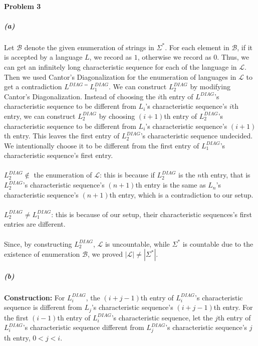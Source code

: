 \documentclass[12pt]{article}
\theoremstyle{definition}
\numberwithin{equation}{section}
\begin{document}
\paragraph{Problem 3}
\subparagraph{(a)} 
Let $\mathcal{B}$ denote the given enumeration of strings in $\Sigma^*$. For each element in $\mathcal{B}$, if it is accepted by a language $L$, we record as $1$, otherwise we record as $0$. Thus, we can get an infinitely long characteristic sequence for each of the language in $\mathcal{L}$. Then we used Cantor’s Diagonalization for the enumeration of languages in $\mathcal{L}$ to get a contradiction $L^{DIAG=}L^{DIAG}_1$. We can construct $L^{DIAG}_2$ by modifying Cantor’s Diagonalization. Instead of choosing the $i$th entry of $L^{DIAG}$'s characteristic sequence to be different from $L_i$'s characteristic sequence's $i$th entry, we can construct $L^{DIAG}_2$ by choosing $(i+1)$th entry of $L^{DIAG}_2$'s characteristic sequence to be different from $L_i$'s characteristic sequence's $(i+1)$th entry. This leaves the first entry of $L^{DIAG}_2$'s characteristic sequence undecided. We intentionally choose it to be different from the first entry of $L^{DIAG}_1$'s characteristic sequence's first entry. \\~\\

$L^{DIAG}_2 \not\in$ the enumeration of $\mathcal{L}$: this is because if $L^{DIAG}_2$ is the $n$th entry, that is $L^{DIAG}_2$'s characteristic sequence's $(n+1)$th entry is the same as $L_n$'s characteristic sequence's $(n+1)$th entry, which is a contradiction to our setup.  \\~\\

$L^{DIAG}_2 \neq L^{DIAG}_1$: this is because of our setup, their characteristic sequences's first entries are different. \\~\\

Since, by constructing $L^{DIAG}_2$, $\mathcal{L}$ is uncountable, while $\Sigma^*$ is countable due to the existence of enumeration $\mathcal{B}$, we proved $|\mathcal{L}| \neq |\Sigma^*|$.

\subparagraph{(b)} 
\textbf{Construction:} For $L^{DIAG}_i$, the $(i+j-1)$th entry of $L^{DIAG}_i$'s characteristic sequence is different from $L_j$'s characteristic sequence's $(i+j-1)$th entry. For the first $(i-1)$th entry of $L^{DIAG}_i$'s characteristic sequence, let the $j$th entry of $L^{DIAG}_i$'s characteristic sequence different from $L^{DIAG}_j$'s characteristic sequence's $j$th entry, $0 < j < i$.\\~\\
\end{document}
